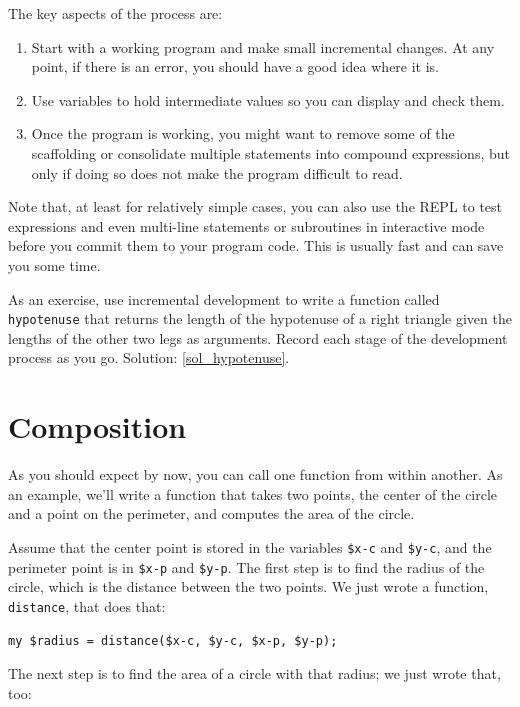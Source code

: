 The key aspects of the process are:

\begin{enumerate}

\item Start with a working program and make small incremental changes. 
At any point, if there is an error, you should have a good idea
where it is.

\item Use variables to hold intermediate values so you can
display and check them.

\item Once the program is working, you might want to remove some of
the scaffolding or consolidate multiple statements into compound
expressions, but only if doing so does not make the program 
difficult to read.

\end{enumerate}

Note that, at least for relatively simple cases, you can also 
use the REPL to test expressions and even multi-line statements 
or subroutines in interactive mode before you commit them to your 
program code. This is usually fast and can save you some time.

\label{hypotenuse}
As an exercise, use incremental development to write a function
called {\tt hypotenuse} that returns the length of the hypotenuse of a
right triangle given the lengths of the other two legs as arguments.
Record each stage of the development process as you go.
Solution: \ref{sol_hypotenuse}.



\section{Composition}

As you should expect by now, you can call one function from within
another.  As an example, we'll write a function that takes two points,
the center of the circle and a point on the perimeter, and computes
the area of the circle.

Assume that the center point is stored in the variables {\tt \$x-c} and
{\tt \$y-c}, and the perimeter point is in {\tt \$x-p} and {\tt \$y-p}. The
first step is to find the radius of the circle, which is the distance
between the two points.  We just wrote a function, {\tt
distance}, that does that:

\begin{verbatim}
my $radius = distance($x-c, $y-c, $x-p, $y-p);
\end{verbatim}
%
The next step is to find the area of a circle with that radius;
we just wrote that, too:

